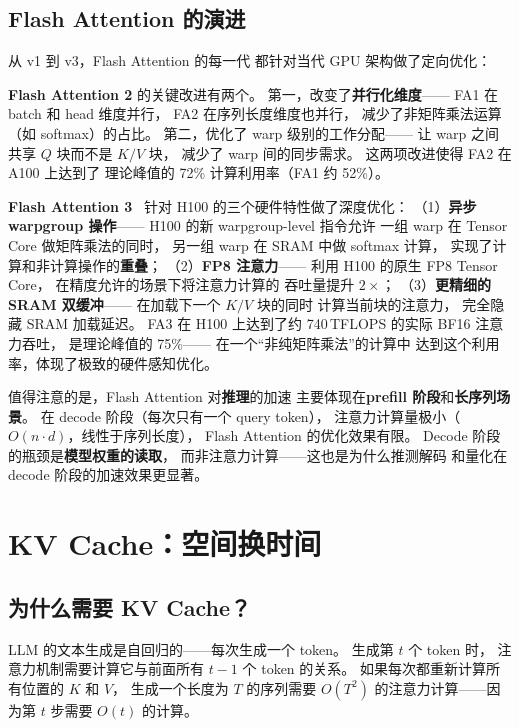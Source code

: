 \subsection{Flash Attention 的演进}

从 v1 到 v3，Flash Attention 的每一代
都针对当代 GPU 架构做了定向优化：

\textbf{Flash Attention 2} 的关键改进有两个。
第一，改变了\textbf{并行化维度}——
FA1 在 batch 和 head 维度并行，
FA2 在序列长度维度也并行，
减少了非矩阵乘法运算（如 softmax）的占比。
第二，优化了 warp 级别的工作分配——
让 warp 之间共享 $Q$ 块而不是 $K/V$ 块，
减少了 warp 间的同步需求。
这两项改进使得 FA2 在 A100 上达到了
理论峰值的 72\% 计算利用率（FA1 约 52\%）。

\textbf{Flash Attention 3}~\cite{shah2024flashattention3}
针对 H100 的三个硬件特性做了深度优化：
（1）\textbf{异步 warpgroup 操作}——
H100 的新 warpgroup-level 指令允许
一组 warp 在 Tensor Core 做矩阵乘法的同时，
另一组 warp 在 SRAM 中做 softmax 计算，
实现了计算和非计算操作的\textbf{重叠}；
（2）\textbf{FP8 注意力}——
利用 H100 的原生 FP8 Tensor Core，
在精度允许的场景下将注意力计算的
吞吐量提升 $2\times$；
（3）\textbf{更精细的 SRAM 双缓冲}——
在加载下一个 $K/V$ 块的同时
计算当前块的注意力，
完全隐藏 SRAM 加载延迟。
FA3 在 H100 上达到了约 740\,TFLOPS 的实际 BF16 注意力吞吐，
是理论峰值的 75\%——
在一个``非纯矩阵乘法''的计算中
达到这个利用率，体现了极致的硬件感知优化。

值得注意的是，Flash Attention 对\textbf{推理}的加速
主要体现在\textbf{prefill 阶段}和\textbf{长序列场景}。
在 decode 阶段（每次只有一个 query token），
注意力计算量极小（$O(n \cdot d)$，线性于序列长度），
Flash Attention 的优化效果有限。
Decode 阶段的瓶颈是\textbf{模型权重的读取}，
而非注意力计算——这也是为什么推测解码
和量化在 decode 阶段的加速效果更显著。


\section{KV Cache：空间换时间}

\subsection{为什么需要 KV Cache？}

LLM 的文本生成是自回归的——每次生成一个 token。
生成第 $t$ 个 token 时，
注意力机制需要计算它与前面所有 $t-1$ 个 token 的关系。
如果每次都重新计算所有位置的 $K$ 和 $V$，
生成一个长度为 $T$ 的序列需要
$O(T^2)$ 的注意力计算——因为第 $t$ 步需要 $O(t)$ 的计算。

